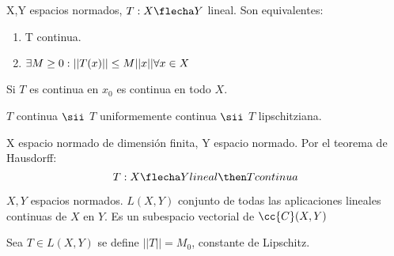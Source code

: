 \begin{prop}
    X,Y espacios normados, $T:X\flecha Y$ lineal. Son equivalentes:
    \begin{enumerate}
        \item T continua.
        \item $\exists M\geq 0 : ||T(x)|| \leq M ||x|| \\\forall x\in X$
    \end{enumerate}
\end{prop}

\begin{observacion}
    Si $T$ es continua en $x_0$ es continua en todo $X$.
\end{observacion}

\begin{observacion}
    $T$ continua $\sii$ $T$ uniformemente continua $\sii$ $T$ lipschitziana.
\end{observacion}

\begin{prop}
    X espacio normado de dimensión finita, Y espacio normado. Por el teorema de Hausdorff:
    $$T:X\flecha Y \\ lineal \then T \\ continua$$
\end{prop}

\begin{definicion}
    $X,Y$ espacios normados. $L(X,Y)$ conjunto de todas las aplicaciones lineales continuas de $X$ en $Y$. Es un subespacio vectorial de $\cc{C}(X,Y)$
\end{definicion}

\begin{definicion}
    Sea $T\in L(X,Y)$ se define $||T|| = M_0$, constante de Lipschitz.
\end{definicion}


